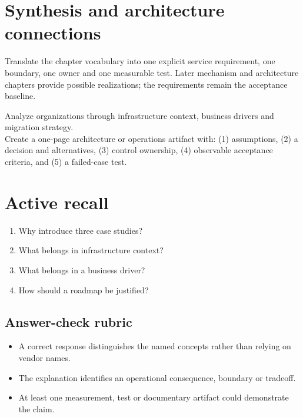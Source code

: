 \documentclass[10pt,letterpaper]{article}
\begin{document}
\section{Synthesis and architecture connections}
Translate the chapter vocabulary into one explicit service requirement, one boundary, one owner and one measurable test. Later mechanism and architecture chapters provide possible realizations; the requirements remain the acceptance baseline.
\begin{workbox}[title={Applied deliverable}]
Analyze organizations through infrastructure context, business drivers and migration strategy.\\[4pt]Create a one-page architecture or operations artifact with: (1) assumptions, (2) a decision and alternatives, (3) control ownership, (4) observable acceptance criteria, and (5) a failed-case test.
\end{workbox}
\section{Active recall}
\begin{enumerate}
\item Why introduce three case studies?
\item What belongs in infrastructure context?
\item What belongs in a business driver?
\item How should a roadmap be justified?
\end{enumerate}
\subsection{Answer-check rubric}
\begin{itemize}
\item A correct response distinguishes the named concepts rather than relying on vendor names.
\item The explanation identifies an operational consequence, boundary or tradeoff.
\item At least one measurement, test or documentary artifact could demonstrate the claim.
\end{itemize}
\end{document}
